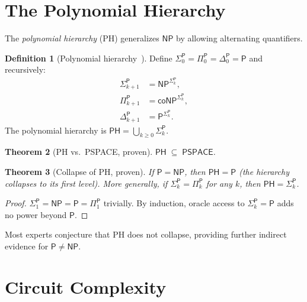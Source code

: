 \documentclass[12pt,a4paper]{amsart}
\newtheorem{theorem}{Theorem}[section]
\theoremstyle{definition}
\newtheorem{definition}[theorem]{Definition}
\newcommand{\Pclass}{\mathsf{P}}
\newcommand{\NP}{\mathsf{NP}}
\newcommand{\coNP}{\mathsf{coNP}}
\newcommand{\PSPACE}{\mathsf{PSPACE}}
\newcommand{\PH}{\mathsf{PH}}
\begin{document}
\section{The Polynomial Hierarchy}
\label{sec:ph}

The \emph{polynomial hierarchy} (PH) generalizes $\NP$ by allowing alternating
quantifiers.

\begin{definition}[Polynomial hierarchy~\cite{stockmeyer1976}]
Define $\Sigma_0^\Pclass = \Pi_0^\Pclass = \Delta_0^\Pclass = \Pclass$ and
recursively:
\begin{align*}
  \Sigma_{k+1}^\Pclass &= \NP^{\Sigma_k^\Pclass},\\
  \Pi_{k+1}^\Pclass &= \coNP^{\Sigma_k^\Pclass},\\
  \Delta_{k+1}^\Pclass &= \Pclass^{\Sigma_k^\Pclass}.
\end{align*}
The polynomial hierarchy is
$\PH = \bigcup_{k\geq 0}\Sigma_k^\Pclass$.
\end{definition}

\begin{theorem}[PH vs.\ PSPACE, proven]
$\PH \;\subseteq\; \PSPACE$.
\end{theorem}

\begin{theorem}[Collapse of PH, proven]
If $\Pclass = \NP$, then $\PH = \Pclass$ (the hierarchy collapses to its
first level).  More generally, if $\Sigma_k^\Pclass = \Pi_k^\Pclass$ for any
$k$, then $\PH = \Sigma_k^\Pclass$.
\end{theorem}

\begin{proof}
$\Sigma_1^\Pclass = \NP = \Pclass = \Pi_1^\Pclass$ trivially.  By induction,
oracle access to $\Sigma_k^\Pclass = \Pclass$ adds no power beyond $\Pclass$.
\end{proof}

Most experts conjecture that PH does not collapse, providing further indirect
evidence for $\Pclass\neq\NP$.

\section{Circuit Complexity}
\label{sec:circuit}
\end{document}
